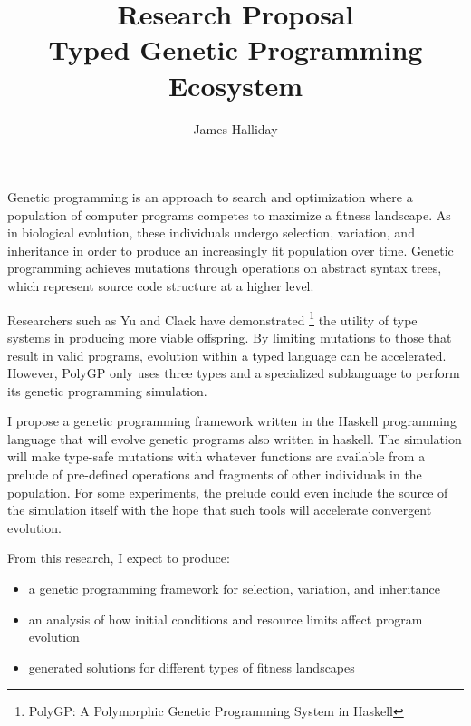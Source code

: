 \documentclass[11pt,a4paper]{article}
\author{James Halliday}
\title{
    Research Proposal \\
    \normalsize{Typed Genetic Programming Ecosystem}
}
\begin{document}
\maketitle

Genetic programming is an approach to search and optimization where
a population of computer programs competes to maximize a fitness landscape.
As in biological evolution, these individuals undergo selection, variation, and
inheritance in order to produce an increasingly fit population over time.
Genetic programming achieves mutations through operations on abstract syntax
trees, which represent source code structure at a higher level.

Researchers such as Yu and Clack have demonstrated
\footnote{PolyGP: A Polymorphic Genetic Programming System in Haskell}
the utility of type systems in producing more viable offspring.
By limiting mutations to those that result in valid programs, evolution within a
typed language can be accelerated. However, PolyGP only uses three types and a
specialized sublanguage to perform its genetic programming simulation.

I propose a genetic programming framework written in the Haskell programming
language that will evolve genetic programs also written in haskell.
The simulation will make type-safe mutations with whatever functions are
available from a prelude of pre-defined operations and fragments of other
individuals in the population.
For some experiments, the prelude could even include the source of the
simulation itself with the hope that such tools will accelerate convergent
evolution.

From this research, I expect to produce:
\begin{itemize}
\item
    a genetic programming framework for selection, variation, and inheritance
\item
    an analysis of how initial conditions and resource limits affect program
    evolution
\item 
    generated solutions for different types of fitness landscapes
\end{itemize}
\end{document}
